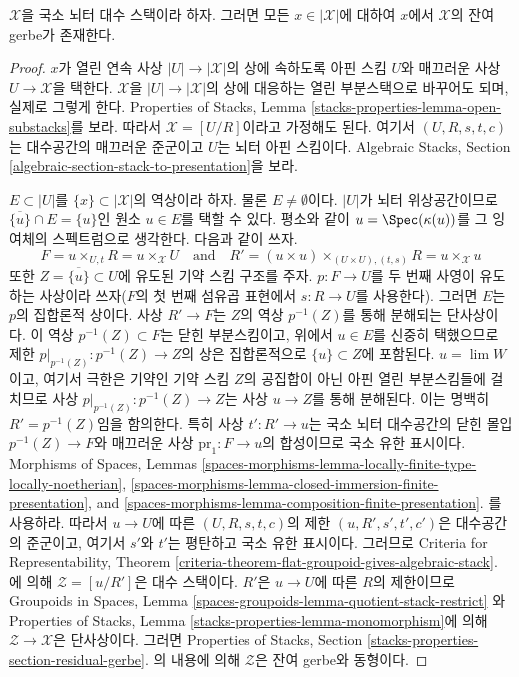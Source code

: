 \begin{lemma}
\label{lemma-every-point-residual-gerbe-locally-Noetherian}
$\mathcal{X}$을 국소 뇌터 대수 스택이라 하자. 그러면 모든
$x \in |\mathcal{X}|$에 대하여 $x$에서 $\mathcal{X}$의 잔여 gerbe가
존재한다.
\end{lemma}

\begin{proof}
$x$가 열린 연속 사상 $|U| \to |\mathcal{X}|$의 상에 속하도록 아핀 스킴
$U$와 매끄러운 사상 $U \to \mathcal{X}$을 택한다. $\mathcal{X}$을
$|U| \to |\mathcal{X}|$의 상에 대응하는 열린 부분스택으로 바꾸어도
되며, 실제로 그렇게 한다. Properties of Stacks, Lemma
\ref{stacks-properties-lemma-open-substacks}를 보라. 따라서
$\mathcal{X} = [U/R]$이라고 가정해도 된다. 여기서
$(U, R, s, t, c)$는 대수공간의 매끄러운 준군이고 $U$는 뇌터 아핀
스킴이다. Algebraic Stacks, Section
\ref{algebraic-section-stack-to-presentation}을 보라.

\medskip\noindent
$E \subset |U|$를 $\{x\} \subset |\mathcal{X}|$의 역상이라 하자. 물론
$E \not = \emptyset$이다. $|U|$가 뇌터 위상공간이므로
$\overline{\{u\}} \cap E = \{u\}$인 원소 $u \in E$를 택할 수 있다.
평소와 같이 $u = \Spec(\kappa(u))$를 그 잉여체의 스펙트럼으로
생각한다. 다음과 같이 쓰자.
$$
F = u \times_{U, t} R = u \times_\mathcal{X} U
\quad\text{and}\quad
R' = (u \times u) \times_{(U \times U), (t, s)} R = u \times_\mathcal{X} u
$$
또한 $Z = \overline{\{u\}} \subset U$에 유도된 기약 스킴 구조를
주자. $p : F \to U$를 두 번째 사영이 유도하는 사상이라 쓰자($F$의
첫 번째 섬유곱 표현에서 $s : R \to U$를 사용한다). 그러면 $E$는
$p$의 집합론적 상이다. 사상 $R' \to F$는 $Z$의 역상 $p^{-1}(Z)$를
통해 분해되는 단사상이다. 이 역상 $p^{-1}(Z) \subset F$는 닫힌
부분스킴이고, 위에서 $u \in E$를 신중히 택했으므로 제한
$p|_{p^{-1}(Z)} : p^{-1}(Z) \to Z$의 상은 집합론적으로
$\{u\} \subset Z$에 포함된다. $u = \lim W$이고, 여기서 극한은 기약인
기약 스킴 $Z$의 공집합이 아닌 아핀 열린 부분스킴들에 걸치므로 사상
$p|_{p^{-1}(Z)} : p^{-1}(Z) \to Z$는 사상 $u \to Z$를 통해 분해된다.
이는 명백히 $R' = p^{-1}(Z)$임을 함의한다. 특히 사상
$t' : R' \to u$는 국소 뇌터 대수공간의 닫힌 몰입
$p^{-1}(Z) \to F$와 매끄러운 사상 $\text{pr}_1 : F \to u$의
합성이므로 국소 유한 표시이다. Morphisms of Spaces, Lemmas
\ref{spaces-morphisms-lemma-locally-finite-type-locally-noetherian},
\ref{spaces-morphisms-lemma-closed-immersion-finite-presentation}, and
\ref{spaces-morphisms-lemma-composition-finite-presentation}.
를 사용하라. 따라서 $u \to U$에 따른 $(U, R, s, t, c)$의 제한
$(u, R', s', t', c')$은 대수공간의 준군이고, 여기서 $s'$와 $t'$는
평탄하고 국소 유한 표시이다. 그러므로 Criteria for Representability,
Theorem
\ref{criteria-theorem-flat-groupoid-gives-algebraic-stack}.
에 의해 $\mathcal{Z} = [u/R']$은 대수 스택이다. $R'$은 $u \to U$에
따른 $R$의 제한이므로 Groupoids in Spaces, Lemma
\ref{spaces-groupoids-lemma-quotient-stack-restrict}
와 Properties of Stacks, Lemma
\ref{stacks-properties-lemma-monomorphism}에 의해
$\mathcal{Z} \to \mathcal{X}$은 단사상이다. 그러면 Properties of Stacks,
Section
\ref{stacks-properties-section-residual-gerbe}.
의 내용에 의해 $\mathcal{Z}$은 잔여 gerbe와 동형이다.
\end{proof}
